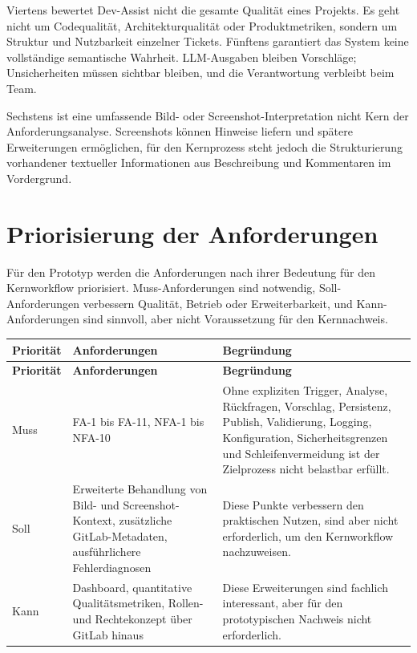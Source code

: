\documentclass[12pt,a4paper,oneside]{scrreprt}
\newenvironment{longtable}[1]{%
  \par\medskip
  \noindent
  \begin{tabular}{#1}%
}{%
  \end{tabular}
  \par\medskip
}
\begin{document}
Viertens bewertet Dev-Assist nicht die gesamte Qualität eines Projekts. Es geht nicht um Codequalität, Architekturqualität oder Produktmetriken, sondern um Struktur und Nutzbarkeit einzelner Tickets. Fünftens garantiert das System keine vollständige semantische Wahrheit. LLM-Ausgaben bleiben Vorschläge; Unsicherheiten müssen sichtbar bleiben, und die Verantwortung verbleibt beim Team.

Sechstens ist eine umfassende Bild- oder Screenshot-Interpretation nicht Kern der Anforderungsanalyse. Screenshots können Hinweise liefern und spätere Erweiterungen ermöglichen, für den Kernprozess steht jedoch die Strukturierung vorhandener textueller Informationen aus Beschreibung und Kommentaren im Vordergrund.

\section{Priorisierung der Anforderungen}

Für den Prototyp werden die Anforderungen nach ihrer Bedeutung für den Kernworkflow priorisiert. Muss-Anforderungen sind notwendig, Soll-Anforderungen verbessern Qualität, Betrieb oder Erweiterbarkeit, und Kann-Anforderungen sind sinnvoll, aber nicht Voraussetzung für den Kernnachweis.

\begin{longtable}{@{}>{\raggedright\arraybackslash}p{0.24\textwidth}>{\raggedright\arraybackslash}p{0.34\textwidth}>{\raggedright\arraybackslash}p{0.34\textwidth}@{}}
\toprule
\textbf{Priorität} & \textbf{Anforderungen} & \textbf{Begründung} \\
\midrule
\endfirsthead
\toprule
\textbf{Priorität} & \textbf{Anforderungen} & \textbf{Begründung} \\
\midrule
\endhead
Muss & FA-1 bis FA-11, NFA-1 bis NFA-10 & Ohne expliziten Trigger, Analyse, Rückfragen, Vorschlag, Persistenz, Publish, Validierung, Logging, Konfiguration, Sicherheitsgrenzen und Schleifenvermeidung ist der Zielprozess nicht belastbar erfüllt. \\
Soll & Erweiterte Behandlung von Bild- und Screenshot-Kontext, zusätzliche GitLab-Metadaten, ausführlichere Fehlerdiagnosen & Diese Punkte verbessern den praktischen Nutzen, sind aber nicht erforderlich, um den Kernworkflow nachzuweisen. \\
Kann & Dashboard, quantitative Qualitätsmetriken, Rollen- und Rechtekonzept über GitLab hinaus & Diese Erweiterungen sind fachlich interessant, aber für den prototypischen Nachweis nicht erforderlich. \\
\bottomrule
\end{longtable}
\end{document}
